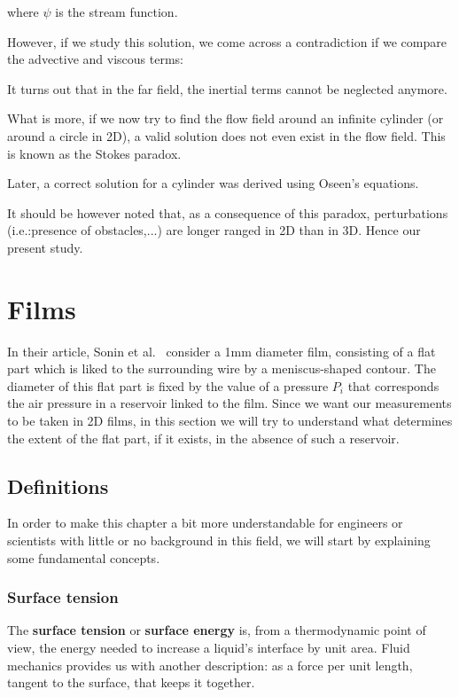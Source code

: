 where $\psi$ is the stream function.

However, if we study this solution, we come across a contradiction if we compare the advective and viscous terms:


It turns out that in the far field, the inertial terms cannot be neglected anymore.

What is more, if we now try to find the flow field around an infinite cylinder (or around a circle in 2D), a valid solution does not even exist in the flow field. This is known as the Stokes paradox.

Later, a correct solution for a cylinder was derived using Oseen's equations. 

It should be however noted that, as a consequence of this paradox, perturbations (i.e.:presence of obstacles,...) are longer ranged in 2D than in 3D. Hence our present study. 

\section{Films}

In their article, Sonin et al.~\cite{SONIN1994} consider a 1mm diameter film, consisting of a flat part which is liked to the surrounding wire by a meniscus-shaped contour. The diameter of this flat part is fixed by the value of a pressure $P_i$ that corresponds the air pressure in a reservoir linked to the film. Since we want our measurements to be taken in 2D films, in this section we will try to understand what determines the extent of the flat part, if it exists, in the absence of such a reservoir.

\subsection{Definitions}

In order to make this chapter a bit more understandable for engineers or scientists with little or no background in this field, we will start by explaining some fundamental concepts.

\subsubsection{Surface tension}

The \textbf{surface tension} or \textbf{surface energy} is, from a thermodynamic point of view, the energy needed to increase a liquid's interface by unit area. Fluid mechanics provides us with another description: as a force per unit length, tangent to the surface, that keeps it together.

